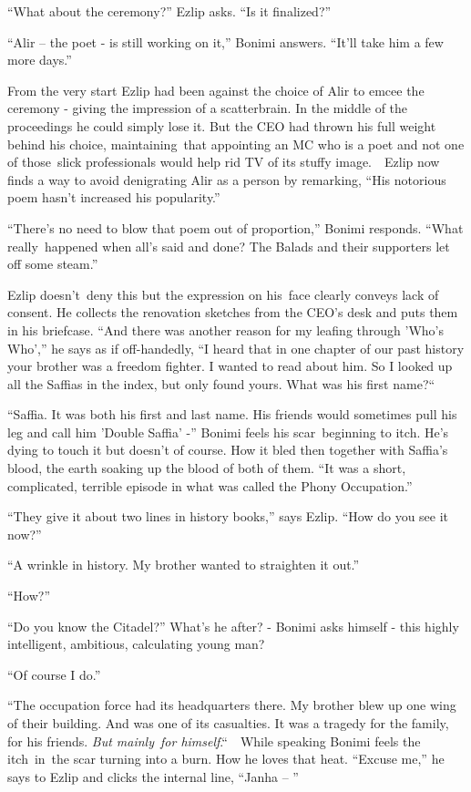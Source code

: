 \documentclass[twoside,11pt]{book}
\begin{document}
``What about the ceremony?'' Ezlip asks. ``Is it finalized?'' 

``Alir -- the poet - is still working on it,'' Bonimi answers. ``It'll take him a
few more days.'' 

From the very start Ezlip had been against the choice of Alir to emcee the ceremony - giving the impression of a
scatterbrain. In the middle of the proceedings he could simply lose it. But the CEO had thrown his full weight behind
his choice, maintaining~that appointing an MC who is a poet and not one of those~slick professionals would help rid TV
of its stuffy image.{\ }~Ezlip now finds a way to avoid denigrating Alir as a person by remarking,
``His notorious poem hasn't increased his popularity.'' 

``There's no need to blow that poem out of proportion,'' Bonimi responds. ``What
really~happened when all's said and done? The Balads and their supporters let off some steam.'' 

Ezlip doesn't~deny this but the expression on his~face clearly conveys lack of consent. He collects the renovation
sketches from the CEO's desk and puts them in his briefcase. ``And there was another reason for my leafing
through {}'Who's Who{}','' he says as if off-handedly, ``I heard that in one chapter of our
past history your brother was a freedom fighter. I wanted to read about him. So I looked up all the Saffias in the
index, but only found yours. What was his first name?``~

``Saffia. It was both his first and last name. His friends would sometimes pull his leg and call him
'Double Saffia' -'' Bonimi feels his scar~beginning to itch. He's dying to touch it but doesn't of course.
How it bled then together with Saffia's blood, the earth soaking up the blood of both of them. ``It was a
short, complicated, terrible episode in what was called the Phony Occupation.''

``They give it about two lines in history books,'' says Ezlip. ``How do you see
it now?'' 

``A wrinkle in history. My brother wanted to straighten it out.'' 

``How?'' 

``Do you know the Citadel?'' What's he after? - Bonimi asks himself - this highly intelligent,
ambitious, calculating young man? 

``Of course I do.'' 

``The occupation force had its headquarters there. My brother blew up one wing of their building. And was
one of its casualties. It was a tragedy for the family, for his friends. \textit{But mainly}\ \textit{for
himself}.``\ \ While speaking Bonimi feels the itch\ in\ the scar turning into a burn. How he loves that
heat. ``Excuse me,'' he says to Ezlip and clicks the internal line, ``Janha --
''
\end{document}
